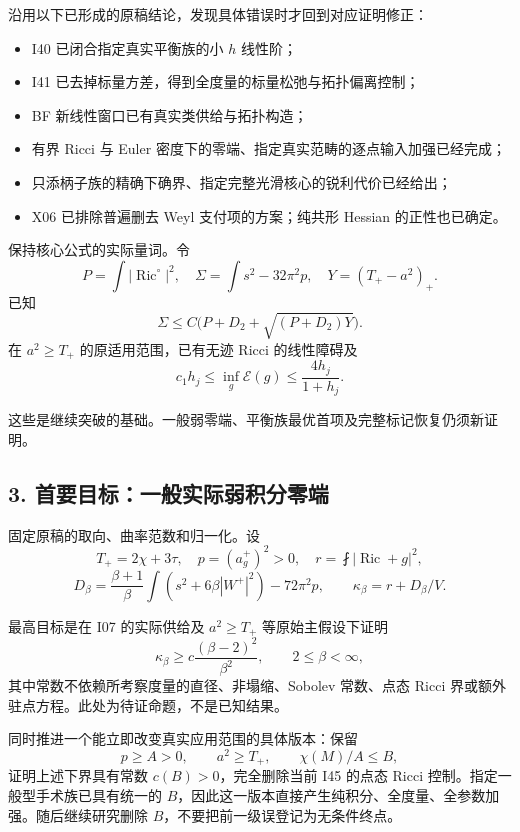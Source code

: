 \documentclass[
  10pt,
]{article}
\providecommand{\tightlist}{%
  \setlength{\itemsep}{0pt}\setlength{\parskip}{0pt}}
\begin{document}
沿用以下已形成的原稿结论，发现具体错误时才回到对应证明修正：

\begin{itemize}
\tightlist
\item
  I40 已闭合指定真实平衡族的小 \(h\) 线性阶；
\item
  I41 已去掉标量方差，得到全度量的标量松弛与拓扑偏离控制；
\item
  BF 新线性窗口已有真实类供给与拓扑构造；
\item
  有界 Ricci 与 Euler 密度下的零端、指定真实范畴的逐点输入加强已经完成；
\item
  只添柄子族的精确下确界、指定完整光滑核心的锐利代价已经给出；
\item
  X06 已排除普遍删去 Weyl 支付项的方案；纯共形 Hessian 的正性也已确定。
\end{itemize}

保持核心公式的实际量词。令 \[
P=\int|\operatorname{Ric}^{\circ}|^2,\quad
\Sigma=\int s^2-32\pi^2p,\quad Y=(T_+-a^2)_+.
\] 已知 \[
\Sigma\le C\bigl(P+D_2+\sqrt{(P+D_2)Y}\bigr).
\] 在 \(a^2\ge T_+\) 的原适用范围，已有无迹 Ricci 的线性障碍及 \[
c_1h_j\le\inf_g\mathcal E(g)\le\frac{4h_j}{1+h_j}.
\]

这些是继续突破的基础。一般弱零端、平衡族最优首项及完整标记恢复仍须新证明。

\hypertarget{ux9996ux8981ux76eeux6807ux4e00ux822cux5b9eux9645ux5f31ux79efux5206ux96f6ux7aef}{%
\subsection{3.
首要目标：一般实际弱积分零端}\label{ux9996ux8981ux76eeux6807ux4e00ux822cux5b9eux9645ux5f31ux79efux5206ux96f6ux7aef}}

固定原稿的取向、曲率范数和归一化。设 \[
T_+=2\chi+3\tau,\quad p=(a_g^+)^2>0,\quad
r=\fint|\operatorname{Ric}+g|^2,
\] \[
D_\beta=\frac{\beta+1}{\beta}
\int(s^2+6\beta|W^+|^2)-72\pi^2p,
\qquad \kappa_\beta=r+D_\beta/V.
\]

最高目标是在 I07 的实际供给及 \(a^2\ge T_+\) 等原始主假设下证明 \[
\boxed{\kappa_\beta\ge c\frac{(\beta-2)^2}{\beta^2},\qquad2\le\beta<\infty,}
\] 其中常数不依赖所考察度量的直径、非塌缩、Sobolev 常数、点态 Ricci
界或额外驻点方程。此处为待证命题，不是已知结果。

同时推进一个能立即改变真实应用范围的具体版本：保留 \[
p\ge A>0,\qquad a^2\ge T_+,\qquad \chi(M)/A\le B,
\] 证明上述下界具有常数 \(c(B)>0\)，完全删除当前 I45 的点态 Ricci
控制。指定一般型手术族已具有统一的
\(B\)，因此这一版本直接产生纯积分、全度量、全参数加强。随后继续研究删除
\(B\)，不要把前一级误登记为无条件终点。
\end{document}
